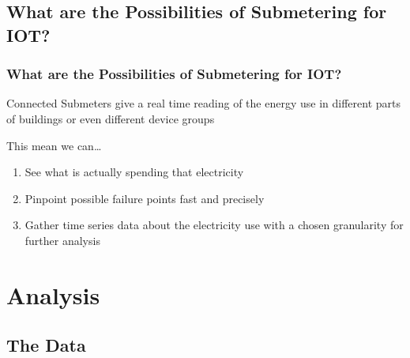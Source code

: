 \documentclass[10pt]{beamer}
\begin{document}
\subsection{What are the Possibilities of Submetering for IOT?}

\begin{frame}
\frametitle{What are the Possibilities of Submetering for IOT?}

Connected Submeters give a real time reading of the energy use in different parts of buildings
or even different device groups

\bigskip

This mean we can\ldots
\begin{enumerate}
    \item See what is actually spending that electricity
    \item Pinpoint possible failure points fast and precisely
    \item Gather time series data about the electricity use with a chosen granularity for further analysis
\end{enumerate}

\end{frame}


\section{Analysis}

\subsection{The Data}
\end{document}
